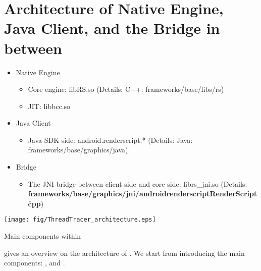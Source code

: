 \section{Architecture of Native Engine, Java Client, and the Bridge in between}
\label{s:Architecture}
\begin{itemize}
	\item Native Engine
	\begin{itemize}
		\item Core engine: libRS.so (Details: C++: frameworks/base/libs/rs)
		\item JIT: libbcc.so
	\end{itemize}
	\item Java Client
	\begin{itemize}
		\item Java SDK side: android.renderscript.* (Details: Java: frameworks/base/graphics/java)
	\end{itemize}
	\item Bridge
	\begin{itemize}
		\item The JNI bridge between client side and core side: librs\_jni.so (Details:  \textbf{frameworks/base/graphics/jni/androidrenderscriptRenderScript\.cpp})
	\end{itemize} 
	
\end{itemize}

\begin{center-figure}
	\texttt{[image: fig/ThreadTracer\_architecture.eps]}
	\caption{Main components within \ThreadTracer{}}
	\label{fig:ThreadTracer_architecture}
\end{center-figure}

 gives an overview on the architecture of \ThreadTracer{}. We start from introducing the main components: \Rewriter{}, \JIT{} and \Tracer{}.


